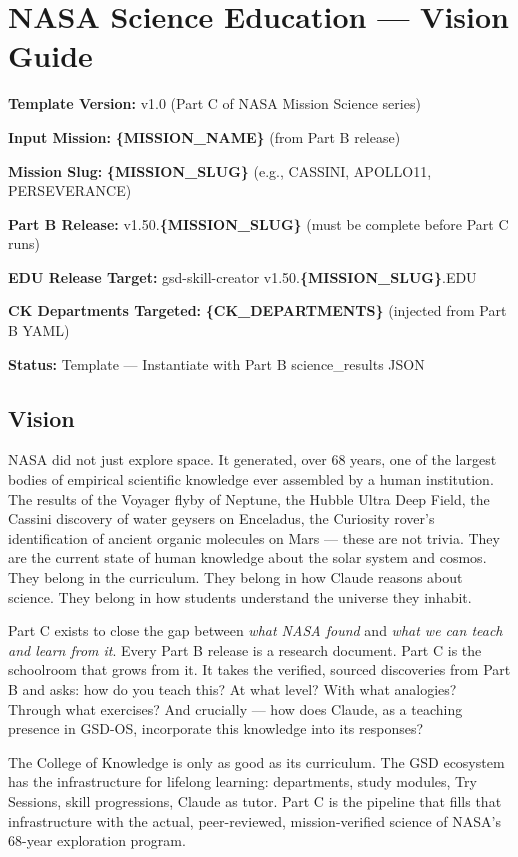 \documentclass[11pt,letterpaper]{article}
\newcommand{\stageheader}[2]{%
  \noindent\colorbox{#2}{\makebox[\textwidth][l]{%
    \textcolor{white}{\bfseries\sffamily\hspace{6pt}#1\hspace{6pt}}}}%
  \vspace{0.5em}\par%
}
\newcommand{\metafield}[2]{\textbf{\sffamily #1} #2\par}
\newcommand{\param}[1]{\textcolor{paramred}{\textbf{\{#1\}}}}
\begin{document}
\newpage
\tableofcontents
\newpage

\stageheader{STAGE 1 --- VISION DOCUMENT}{primary}

\section{NASA Science Education --- Vision Guide}

\metafield{Template Version:}{v1.0 (Part C of NASA Mission Science series)}
\metafield{Input Mission:}{\param{MISSION\_NAME} (from Part B release)}
\metafield{Mission Slug:}{\param{MISSION\_SLUG} (e.g., CASSINI, APOLLO11, PERSEVERANCE)}
\metafield{Part B Release:}{v1.50.\param{MISSION\_SLUG} (must be complete before Part C runs)}
\metafield{EDU Release Target:}{gsd-skill-creator v1.50.\param{MISSION\_SLUG}.EDU}
\metafield{CK Departments Targeted:}{\param{CK\_DEPARTMENTS} (injected from Part B YAML)}
\metafield{Status:}{Template --- Instantiate with Part B science\_results JSON}

\subsection{Vision}

NASA did not just explore space. It generated, over 68 years, one of the largest bodies of empirical scientific knowledge ever assembled by a human institution. The results of the Voyager flyby of Neptune, the Hubble Ultra Deep Field, the Cassini discovery of water geysers on Enceladus, the Curiosity rover's identification of ancient organic molecules on Mars --- these are not trivia. They are the current state of human knowledge about the solar system and cosmos. They belong in the curriculum. They belong in how Claude reasons about science. They belong in how students understand the universe they inhabit.

Part C exists to close the gap between \textit{what NASA found} and \textit{what we can teach and learn from it}. Every Part B release is a research document. Part C is the schoolroom that grows from it. It takes the verified, sourced discoveries from Part B and asks: how do you teach this? At what level? With what analogies? Through what exercises? And crucially --- how does Claude, as a teaching presence in GSD-OS, incorporate this knowledge into its responses?

The College of Knowledge is only as good as its curriculum. The GSD ecosystem has the infrastructure for lifelong learning: departments, study modules, Try Sessions, skill progressions, Claude as tutor. Part C is the pipeline that fills that infrastructure with the actual, peer-reviewed, mission-verified science of NASA's 68-year exploration program.
\end{document}
